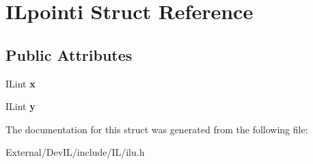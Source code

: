 \hypertarget{structILpointi}{
\section{ILpointi Struct Reference}
\label{structILpointi}
}
\subsection*{Public Attributes}
\begin{DoxyCompactItemize}
\item 
\hypertarget{structILpointi_a12cb4b980c0b1b6e5dfcaf04cae1d504}{
ILint {\bfseries x}}
\label{structILpointi_a12cb4b980c0b1b6e5dfcaf04cae1d504}

\item 
\hypertarget{structILpointi_a403879303445d06970e87be9d38ecce5}{
ILint {\bfseries y}}
\label{structILpointi_a403879303445d06970e87be9d38ecce5}

\end{DoxyCompactItemize}


The documentation for this struct was generated from the following file:\begin{DoxyCompactItemize}
\item 
External/DevIL/include/IL/ilu.h\end{DoxyCompactItemize}
